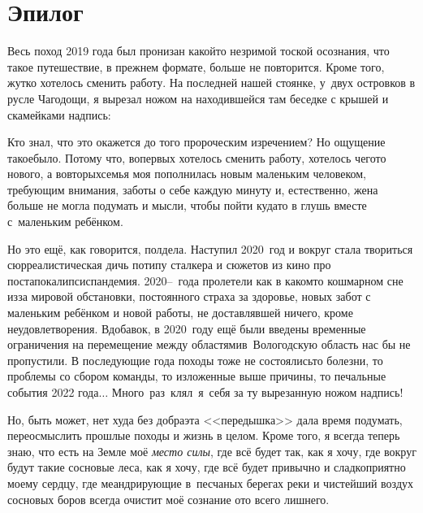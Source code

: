\newpage
{
\thispagestyle{empty}
\section*{Эпилог}

Весь поход 2019 года был пронизан какой\sdash то незримой тоской осознания, что такое путешествие, в прежнем формате, больше не повторится. Кроме того, жутко хотелось сменить работу. На последней нашей стоянке, у~двух островков в русле Чагодощи, я вырезал ножом на находившейся там беседке с крышей и скамейками надпись:

{\centering\Large{}}

Кто знал, что это окажется до того пророческим изречением? Но ощущение такое\mdash было. Потому что, во\sdash первых хотелось сменить работу, хотелось чего\sdash то нового, а во\sdash вторых\mdash семья моя пополнилась новым маленьким человеком, требующим внимания, заботы о себе каждую минуту и, естественно, жена больше не могла подумать и мысли, чтобы пойти куда\sdash то в глушь вместе с~маленьким ребёнком.

Но это ещё, как говорится, полдела. Наступил 2020~год и вокруг стала твориться сюрреалистическая дичь потипу сталкера и сюжетов из кино про постапокалипсис\mdash пандемия. 2020\thinspace\nobreakdash--~года пролетели как в каком\sdash то кошмарном сне из\sdash за мировой обстановки, постоянного страха за здоровье, новых забот с маленьким ребёнком и новой работы, не доставлявшей ничего, кроме неудовлетворения. Вдобавок, в 2020~году ещё были введены временные ограничения на перемещение между областями\mdash в~Вологодскую область нас бы не пропустили. В последующие года походы тоже не состоялись\mdash то болезни, то проблемы со сбором команды, то изложенные выше причины, то печальные события 2022 года$\ldots$ Много~раз~клял~я~себя за ту вырезанную ножом надпись!

Но, быть может, нет худа без добра\mdash эта <<передышка>> дала время подумать, переосмыслить прошлые походы и жизнь в целом. Кроме того, я всегда теперь знаю, что есть на Земле моё \textit{место силы}, где всё будет так, как я хочу, где вокруг будут такие сосновые леса, как я хочу, где всё будет привычно и сладко\sdash приятно моему сердцу, где меандрирующие в~песчаных берегах реки и чистейший воздух сосновых боров всегда очистит моё сознание ото всего лишнего.

}
